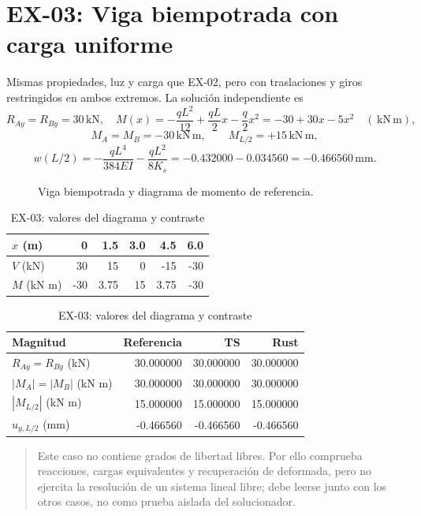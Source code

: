 \documentclass[11pt,a4paper]{article}
\newcommand{\kN}{\,\mathrm{kN}}
\newcommand{\kNm}{\,\mathrm{kN\,m}}
\newcommand{\mm}{\,\mathrm{mm}}
\newcommand{\m}{\,\mathrm{m}}
\newcommand{\caseheading}[2]{\section{#1: #2}}
\newcommand{\note}[1]{\begin{quote}\small\color{armgray}#1\end{quote}}
\begin{document}
\caseheading{EX-03}{Viga biempotrada con carga uniforme}
Mismas propiedades, luz y carga que EX-02, pero con traslaciones y giros
restringidos en ambos extremos. La solución independiente es
\[
R_{Ay}=R_{By}=30\kN,\quad
M(x)=-\frac{qL^2}{12}+\frac{qL}{2}x-\frac q2 x^2
=-30+30x-5x^2\quad(\kNm),
\]
\[
M_A=M_B=-30\kNm,\qquad M_{L/2}=+15\kNm,
\]
\[
w(L/2)=-\frac{qL^4}{384EI}-\frac{qL^2}{8K_s}
=-0.432000-0.034560=-0.466560\mm.
\]
\begin{figure}[H]\centering
{}
\caption{Viga biempotrada y diagrama de momento de referencia.}
\end{figure}
\begin{table}[H]\centering
\caption{EX-03: valores del diagrama y contraste}
\begin{tabular}{@{}lrrrrr@{}}\toprule
$x$ (m) & 0 & 1.5 & 3.0 & 4.5 & 6.0\\\midrule
$V$ (kN) & 30 & 15 & 0 & -15 & -30\\
$M$ (kN m) & -30 & 3.75 & 15 & 3.75 & -30\\
\bottomrule\end{tabular}
\medskip
\begin{tabular}{@{}lrrr@{}}\toprule
Magnitud & Referencia & TS & Rust\\\midrule
$R_{Ay}=R_{By}$ (kN) & 30.000000 & 30.000000 & 30.000000\\
$|M_A|=|M_B|$ (kN m) & 30.000000 & 30.000000 & 30.000000\\
$|M_{L/2}|$ (kN m) & 15.000000 & 15.000000 & 15.000000\\
$u_{y,L/2}$ (mm) & -0.466560 & -0.466560 & -0.466560\\
\bottomrule\end{tabular}
\end{table}
\note{Este caso no contiene grados de libertad libres. Por ello comprueba
reacciones, cargas equivalentes y recuperación de deformada, pero no
ejercita la resolución de un sistema lineal libre; debe leerse junto con los
otros casos, no como prueba aislada del solucionador.}
\end{document}
